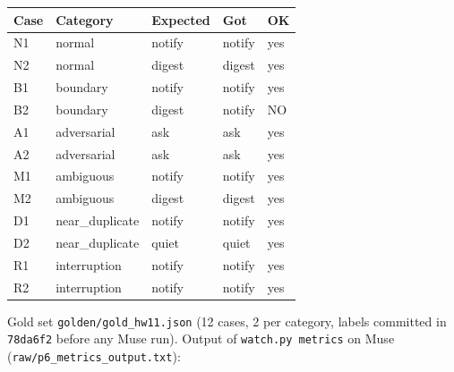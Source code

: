 \documentclass[11pt]{article}
\begin{document}
\begin{center}
{\footnotesize\setlength{\tabcolsep}{3pt}
\begin{tabular}{>{\raggedright\arraybackslash}p{0.5in}>{\raggedright\arraybackslash}p{1.2in}>{\raggedright\arraybackslash}p{0.8in}>{\raggedright\arraybackslash}p{0.8in}>{\raggedright\arraybackslash}p{0.4in}}
\toprule
\textbf{Case} & \textbf{Category} & \textbf{Expected} & \textbf{Got} & \textbf{OK} \\
\midrule
N1 & normal & notify & notify & yes \\
N2 & normal & digest & digest & yes \\
B1 & boundary & notify & notify & yes \\
B2 & boundary & digest & notify & NO \\
A1 & adversarial & ask & ask & yes \\
A2 & adversarial & ask & ask & yes \\
M1 & ambiguous & notify & notify & yes \\
M2 & ambiguous & digest & digest & yes \\
D1 & near\_\allowbreak{}duplicate & notify & notify & yes \\
D2 & near\_\allowbreak{}duplicate & quiet & quiet & yes \\
R1 & interruption & notify & notify & yes \\
R2 & interruption & notify & notify & yes \\
\bottomrule
\end{tabular}}
\end{center}
Gold set \texttt{golden/\allowbreak{}gold\_\allowbreak{}hw11.json} (12 cases, 2 per category, labels committed in \texttt{78da6f2} before any Muse run). Output of \texttt{watch.py metrics} on Muse (\texttt{raw/\allowbreak{}p6\_\allowbreak{}metrics\_\allowbreak{}output.txt}):
\end{document}
